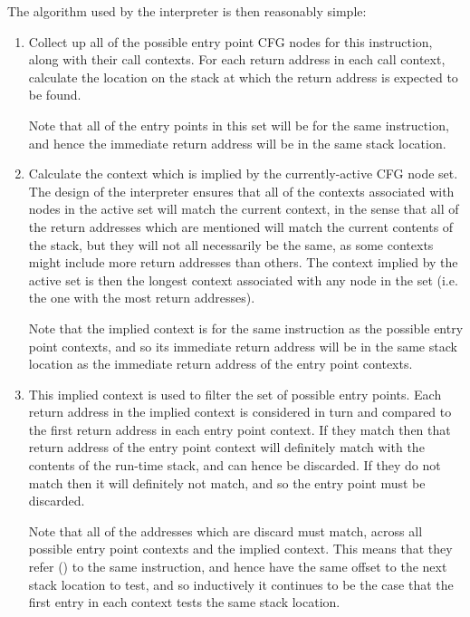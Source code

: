 The algorithm used by the interpreter is then reasonably simple:                                                                                                             

\begin{enumerate}
\item Collect up all of the possible entry point CFG nodes for this
  instruction, along with their call contexts.  For each return
  address in each call context, calculate the location on the stack at
  which the return address is expected to be found.

  Note that all of the entry points in this set will be for the same
  instruction, and hence the immediate return address will be in the
  same stack location.

\item Calculate the context which is implied by the currently-active
  CFG node set.  The design of the interpreter ensures that all of the
  contexts associated with nodes in the active set will match the
  current context, in the sense that all of the return addresses which
  are mentioned will match the current contents of the stack, but they
  will not all necessarily be the same, as some contexts might include
  more return addresses than others.  The context implied by the
  active set is then the longest context associated with any node in
  the set (i.e. the one with the most return addresses).
  
  Note that the implied context is for the same instruction as the
  possible entry point contexts, and so its immediate return address
  will be in the same stack location as the immediate return address
  of the entry point contexts.
  
\item This implied context is used to filter the set of possible entry
  points.  Each return address in the implied context is considered in
  turn and compared to the first return address in each entry point
  context.  If they match then that return address of the entry point
  context will definitely match with the contents of the run-time
  stack, and can hence be discarded.  If they do not match then it
  will definitely not match, and so the entry point must be discarded.

  Note that all of the addresses which are discard must match, across
  all possible entry point contexts and the implied context.  This
  means that they refer () to the same
  instruction, and hence have the same offset to the next stack
  location to test, and so inductively it continues to be the case
  that the first entry in each context tests the same stack location.


\end{enumerate}
